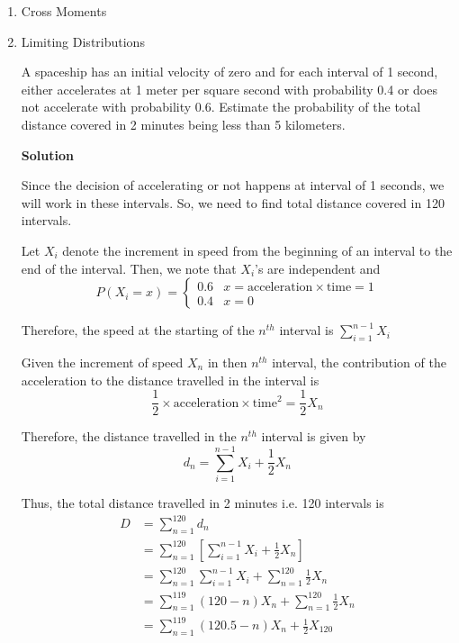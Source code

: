 \documentclass[12pt, oneside]{article}
\begin{document}
\begin{enumerate}
\item Cross Moments

\item {
    Limiting Distributions

    A spaceship has an initial velocity of zero and for each interval of 1 second,
    either accelerates at 1 meter per square second with probability 0.4 or does not 
    accelerate with probability 0.6. Estimate the probability of the total distance covered
    in 2 minutes being less than 5 kilometers.

    \textbf{Solution}

    Since the decision of accelerating or not happens at interval of 1 seconds, we will
    work in these intervals. So, we need to find total distance covered in 120 intervals.

    Let \(X_i\) denote the increment in speed from the beginning of an interval to the
    end of the interval. Then, we note that \(X_i\)'s are independent and 
    \[
        P(X_i = x) = \begin{cases}
                        0.6 & x = \text{acceleration} \times \text{time} = 1 \\
                        0.4 & x = 0
                     \end{cases}
    \]

    Therefore, the speed at the starting of the \(n^{th}\) interval is 
    \(\sum_{i=1}^{n-1} X_i\)

    Given the increment of speed \(X_n\) in then \(n^{th}\) interval, the contribution of the
    acceleration to the distance travelled in the interval is
    \[\frac{1}{2} \times \text{acceleration} \times \text{time}^2 = \frac{1}{2} X_n\]

    Therefore, the distance travelled in the \(n^{th}\) interval is given by
    \[
        d_n = \sum_{i=1}^{n-1} X_i + \frac{1}{2} X_n
    \]

    Thus, the total distance travelled in 2 minutes i.e. 120 intervals is
    \begin{align*}
        D &= \sum_{n = 1}^{120} d_n \\
          &= \sum_{n = 1}^{120} \left[\sum_{i=1}^{n-1} X_i + \frac{1}{2} X_n\right] \\
          &= \sum_{n = 1}^{120} \sum_{i=1}^{n-1} X_i + \sum_{n = 1}^{120} \frac{1}{2} X_n \\
          &= \sum_{n = 1}^{119} (120 - n) X_n + \sum_{n = 1}^{120} \frac{1}{2} X_n 
                          \tag*{(Expanding the double summation)} \\   
          &= \sum_{n = 1}^{119} (120.5 - n) X_n + \frac{1}{2}X_{120}
    \end{align*}

}
\end{enumerate}
\end{document}

